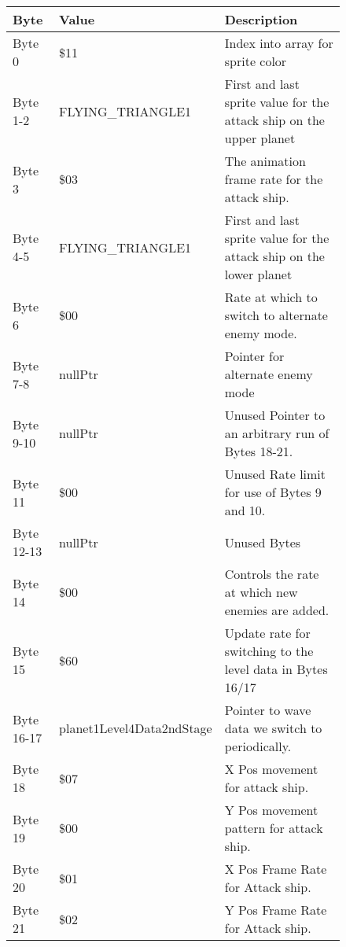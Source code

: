 \begin{figure}[H]
{\begin{adjustbox}{width=12cm}
\begin{tabular}{lll}
\toprule
 Byte       & Value                     & Description                                                         \\
\midrule
 Byte 0     & \$11                       & Index into array for sprite color                                   \\
 Byte 1-2   & FLYING\_TRIANGLE1          & First and last sprite value for the attack ship on the upper planet \\
 Byte 3     & \$03                       & The animation frame rate for the attack ship.                       \\
 Byte 4-5   & FLYING\_TRIANGLE1          & First and last sprite value for the attack ship on the lower planet \\
 Byte 6     & \$00                       & Rate at which to switch to alternate enemy mode.                    \\
 Byte 7-8   & nullPtr                   & Pointer for alternate enemy mode                                    \\
 Byte 9-10  & nullPtr                   & Unused Pointer to an arbitrary run of Bytes 18-21.                  \\
 Byte 11    & \$00                       & Unused Rate limit for use of Bytes 9 and 10.                        \\
 Byte 12-13 & nullPtr                   & Unused Bytes                                                        \\
 Byte 14    & \$00                       & Controls the rate at which new enemies are added.                   \\
 Byte 15    & \$60                       & Update rate for switching to the level data in Bytes 16/17          \\
 Byte 16-17 & planet1Level4Data2ndStage & Pointer to wave data we switch to periodically.                     \\
 Byte 18    & \$07                       & X Pos movement for attack ship.                                     \\
 Byte 19    & \$00                       & Y Pos movement pattern for attack ship.                             \\
 Byte 20    & \$01                       & X Pos Frame Rate for Attack ship.                                   \\
 Byte 21    & \$02                       & Y Pos Frame Rate for Attack ship.                                   \\

\end{tabular}
\end{adjustbox}}
\end{figure}
